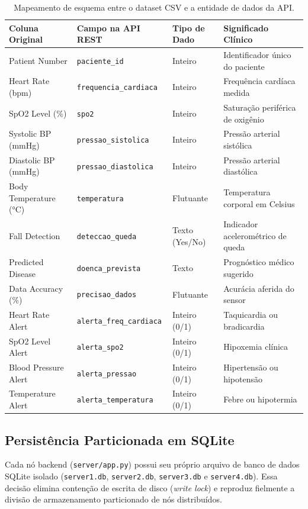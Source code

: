 \documentclass[12pt,a4paper]{article}
\begin{document}
\begin{table}[H]
	\centering
	\small
	\begin{tabularx}{\textwidth}{p{3.4cm} p{3.4cm} p{2.2cm} X}
		\toprule
		\textbf{Coluna Original} & \textbf{Campo na API REST} & \textbf{Tipo de Dado} & \textbf{Significado Clínico} \\
		\midrule
		Patient Number & \texttt{paciente\_id} & Inteiro & Identificador único do paciente \\
		Heart Rate (bpm) & \texttt{frequencia\_cardiaca} & Inteiro & Frequência cardíaca medida \\
		SpO2 Level (\%) & \texttt{spo2} & Inteiro & Saturação periférica de oxigênio \\
		Systolic BP (mmHg) & \texttt{pressao\_sistolica} & Inteiro & Pressão arterial sistólica \\
		Diastolic BP (mmHg) & \texttt{pressao\_diastolica} & Inteiro & Pressão arterial diastólica \\
		Body Temperature (°C) & \texttt{temperatura} & Flutuante & Temperatura corporal em Celsius \\
		Fall Detection & \texttt{deteccao\_queda} & Texto (Yes/No) & Indicador acelerométrico de queda \\
		Predicted Disease & \texttt{doenca\_prevista} & Texto & Prognóstico médico sugerido \\
		Data Accuracy (\%) & \texttt{precisao\_dados} & Flutuante & Acurácia aferida do sensor \\
		Heart Rate Alert & \texttt{alerta\_freq\_cardiaca} & Inteiro (0/1) & Taquicardia ou bradicardia \\
		SpO2 Level Alert & \texttt{alerta\_spo2} & Inteiro (0/1) & Hipoxemia clínica \\
		Blood Pressure Alert & \texttt{alerta\_pressao} & Inteiro (0/1) & Hipertensão ou hipotensão \\
		Temperature Alert & \texttt{alerta\_temperatura} & Inteiro (0/1) & Febre ou hipotermia \\
		\bottomrule
	\end{tabularx}
	\caption{Mapeamento de esquema entre o dataset CSV e a entidade de dados da API.}
	\label{tab:schema}
\end{table}

\subsection{Persistência Particionada em SQLite}
Cada nó backend (\texttt{server/app.py}) possui seu próprio arquivo de banco de dados SQLite isolado (\texttt{server1.db}, \texttt{server2.db}, \texttt{server3.db} e \texttt{server4.db}). Essa decisão elimina contenção de escrita de disco (\textit{write lock}) e reproduz fielmente a divisão de armazenamento particionado de nós distribuídos.
\end{document}
